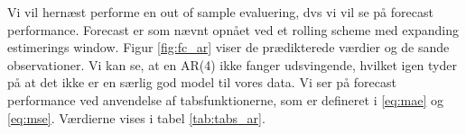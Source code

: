 %
Vi vil hernæst performe en out of sample evaluering, dvs vi vil se på forecast performance.
Forecast er som nævnt opnået ved et rolling scheme med expanding estimerings window. 
Figur \ref{fig:fc_ar} viser de prædikterede værdier og de sande observationer. Vi kan se, at en AR(4) ikke fanger udsvingende, hvilket igen tyder på at det ikke er en særlig god model til vores data. 
Vi ser på forecast performance ved anvendelse af tabsfunktionerne, som er defineret i \eqref{eq:mae} og \eqref{eq:mse}. Værdierne vises i tabel \ref{tab:tabs_ar}.  










%
%
%
%
%
%
%
%
% 
%
%
%




